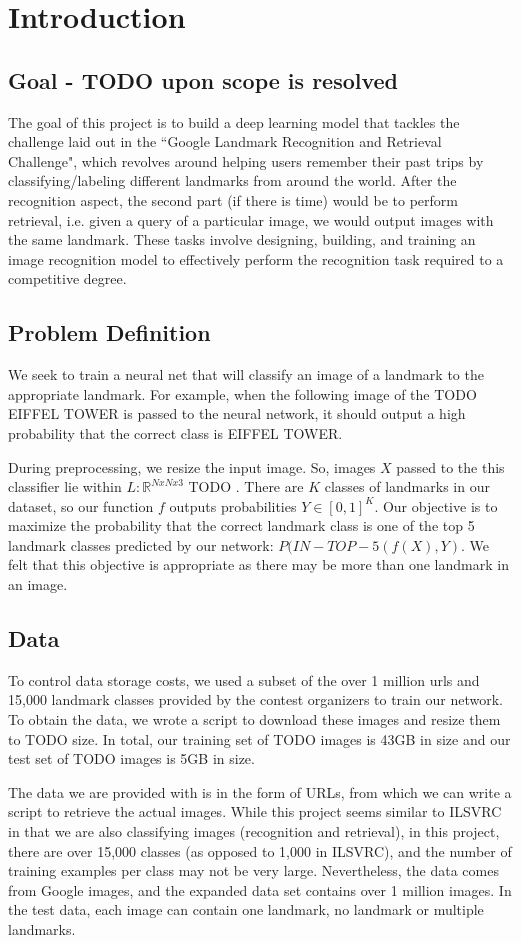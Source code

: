\section{Introduction}
\subsection{Goal - TODO upon scope is resolved}
The goal of this project is to build a deep learning model that tackles the challenge laid out in the ``Google Landmark Recognition and Retrieval Challenge", which revolves around helping users remember their past trips by classifying/labeling different landmarks from around the world. After the recognition aspect, the second part (if there is time) would be to perform retrieval, i.e. given a query of a particular image, we would output images with the same landmark. These tasks involve designing, building, and training an image recognition model to effectively perform the recognition task required to a competitive degree.
\subsection{Problem Definition}
We seek to train a neural net that will classify an image of a landmark to the appropriate landmark. For example, when the following image of the TODO EIFFEL TOWER is passed to the neural network, it should output a high probability that the correct class is EIFFEL TOWER.

During preprocessing, we resize the input image. So, images $X$ passed to the this classifier lie within $L: \mathbb{R}^{NxNx3}$ TODO . There are $K$ classes of landmarks in our dataset, so our function $f$ outputs probabilities $Y \in [0,1]^K$. Our objective is to maximize the probability that the correct landmark class is one of the top 5 landmark classes predicted by our network: $P(IN-TOP-5(f(X),Y)$. We felt that this objective is appropriate as there may be more than one landmark in an image.
\subsection{Data}
To control data storage costs, we used a subset of the over 1 million urls and 15,000 landmark classes provided by the contest organizers to train our network. To obtain the data, we wrote a script to download these images and resize them to TODO size. In total, our training set of TODO images is 43GB in size and our test set of TODO images is 5GB in size. 

The data we are provided with is in the form of URLs, from which we can write a script to retrieve the actual images. While this project seems similar to ILSVRC in that we are also classifying images (recognition and retrieval), in this project, there are over 15,000 classes (as opposed to 1,000 in ILSVRC), and the number of training examples per class may not be very large. Nevertheless, the data comes from Google images, and the expanded data set contains over 1 million images. In the test data, each image can contain one landmark, no landmark or multiple landmarks.